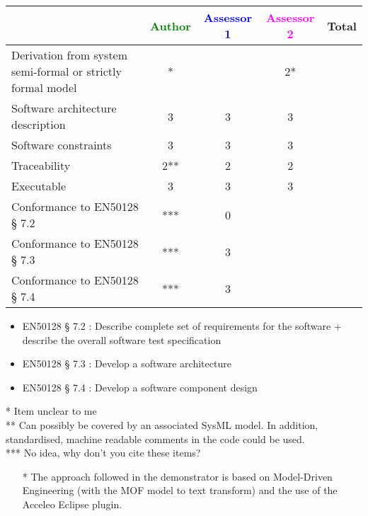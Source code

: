 \begin{tabular}{|l | c | c | c | c|}
\hline
& \textcolor{green}{Author} & \textcolor{blue}{Assessor 1} & \textcolor{magenta}{Assessor 2} & Total \\
\hline
Derivation from system semi-formal or strictly formal model &* & &2* & \\
\hline
Software architecture description &3 & 3 &3 & \\
\hline
Software constraints &3 &3 &3 & \\
\hline
Traceability &2** &2 &2 & \\
\hline
Executable &3 &3 &3 & \\
\hline
Conformance to EN50128 § 7.2 &*** &0 & & \\
\hline
Conformance to EN50128 § 7.3 &*** &3 & & \\
\hline
Conformance to EN50128 § 7.4 &*** &3 & & \\
\hline
\end{tabular}
\begin{assessor1}
\begin{itemize}
\item  EN50128 § 7.2 : Describe complete set of requirements for the
  software + describe the overall software test specification
\item EN50128 § 7.3 :  Develop a software architecture 
\item EN50128 § 7.4 : Develop a software component design
\end{itemize}
\end{assessor1}

\begin{author_comment}
* Item unclear to me\\
** Can possibly be covered by an associated SysML model. In addition, standardised, machine readable comments in the code could be used.\\
*** No idea, why don't you cite these items?
\end{author_comment}

\begin{assessor2}
  \begin{itemize}
  \item[*] The approach followed in the demonstrator is based on
    Model-Driven Engineering (with the MOF model to text transform)
    and the use of the Acceleo Eclipse plugin.
  \end{itemize}  
\end{assessor2}



